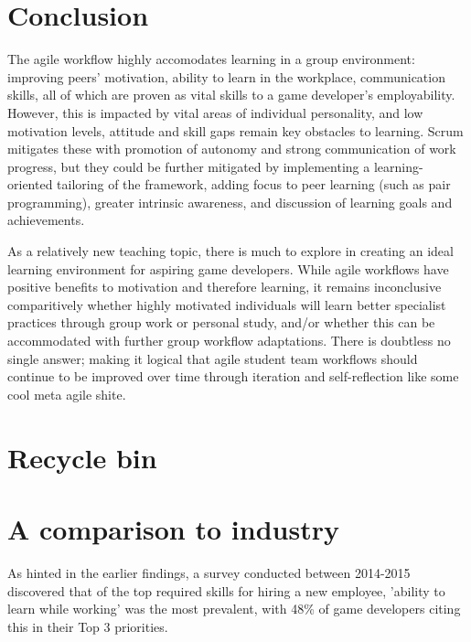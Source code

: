 \documentclass{scrartcl}
\begin{document}
\section{Conclusion}
The agile workflow highly accomodates learning in a group environment: improving peers' motivation, ability to learn in the workplace, communication skills, all of which are proven as vital skills to a game developer's employability. However, this is impacted by vital areas of individual personality, and low motivation levels, attitude and skill gaps remain key obstacles to learning. Scrum mitigates these with promotion of autonomy and strong communication of work progress, but they could be further mitigated by implementing a learning-oriented tailoring of the framework, adding focus to peer learning (such as pair programming), greater intrinsic awareness, and discussion of learning goals and achievements.

As a relatively new teaching topic, there is much to explore in creating an ideal learning environment for aspiring game developers. While agile workflows have positive benefits to motivation and therefore learning, it remains inconclusive comparitively whether highly motivated individuals will learn better specialist practices through group work or personal study, and/or whether this can be accommodated with further group workflow adaptations. There is doubtless no single answer; making it logical that agile student team workflows should continue to be improved over time through iteration and self-reflection like some cool meta agile shite.


\section{Recycle bin}
\section{A comparison to industry}
As hinted in the earlier findings, a survey conducted between 2014-2015 discovered that of the top required skills for hiring a new employee, 'ability to learn while working' \cite{devstudy} was the most prevalent, with 48\% of game developers citing this in their Top 3 priorities.

\end{document}
